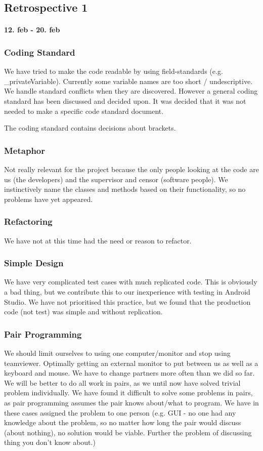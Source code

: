 \subsection*{Retrospective 1}
\paragraph{12. feb - 20. feb}

\subsubsection{Coding Standard}
We have tried to make the code readable by using field-standards (e.g. _privateVariable). Currently some variable names are too short / undescriptive.
We handle standard conflicts when they are discovered.
However a general coding standard has been discussed and decided upon. It was decided that it was not needed to make a specific code standard document.

The coding standard contains decisions about brackets.

\subsubsection{Metaphor}
Not really relevant for the project because the only people looking at the code are us (the developers) and the supervisor and censor (software people).
We instinctively name the classes and methods based on their functionality, so no problems have yet appeared.

\subsubsection{Refactoring}
We have not at this time had the need or reason to refactor.

\subsubsection{Simple Design}
We have very complicated test cases with much replicated code. This is obviously a bad thing, but we contribute this to our inexperience with testing in Android Studio.
We have not prioritised this practice, but we found that the production code (not test) was simple and without replication.

\subsubsection{Pair Programming}
We should limit ourselves to using one computer/monitor and stop using teamviewer. Optimally getting an external monitor to put between us as well as a keyboard and mouse.
We have to change partners more often than we did so far.
We will be better to do all work in pairs, as we until now have solved trivial problem individually.
We have found it difficult to solve some problems in pairs, as pair programming assumes the pair knows about/what to program. We have in these cases assigned the problem to one person (e.g. GUI - no one had any knowledge about the problem, so no matter how long the pair would discuss (about nothing), no solution would be viable. Further the problem of discussing thing you don’t know about.)

